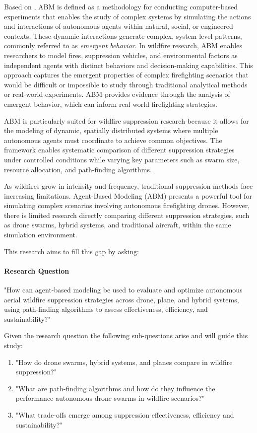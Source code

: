 \documentclass[twoside]{article}
\begin{document}
Based on \citet{wilensky2015introduction}, ABM is defined as a methodology for conducting computer-based experiments that enables the study of complex systems by simulating the actions and interactions of autonomous agents within natural, social, or engineered contexts. These dynamic interactions generate complex, system-level patterns, commonly referred to as \textit{emergent behavior}. In wildfire research, ABM enables researchers to model fires, suppression vehicles, and environmental factors as independent agents with distinct behaviors and decision-making capabilities. This approach captures the emergent properties of complex firefighting scenarios that would be difficult or impossible to study through traditional analytical methods or real-world experiments. ABM provides evidence through the analysis of emergent behavior, which can inform real-world firefighting strategies.

ABM is particularly suited for wildfire suppression research because it allows for the modeling of dynamic, spatially distributed systems where multiple autonomous agents must coordinate to achieve common objectives. The framework enables systematic comparison of different suppression strategies under controlled conditions while varying key parameters such as swarm size, resource allocation, and path-finding algorithms.

As wildfires grow in intensity and frequency, traditional suppression methods face increasing limitations. Agent-Based Modeling (ABM) presents a powerful tool for simulating complex scenarios involving autonomous firefighting drones. However, there is limited research directly comparing different suppression strategies, such as drone swarms, hybrid systems, and traditional aircraft, within the same simulation environment.

This research aims to fill this gap by asking:

\paragraph{Research Question}

"How can agent-based modeling be used to evaluate and optimize autonomous aerial wildfire suppression strategies across drone, plane, and hybrid systems, using path-finding algorithms to assess effectiveness, efficiency, and sustainability?"

Given the research question the following sub-questions arise and will guide this study:
\begin{enumerate}
    \item "How do drone swarms, hybrid systems, and planes compare in wildfire suppression?"
    \item "What are path-finding algorithms and how do they influence the performance autonomous drone swarms in wildfire scenarios?"
    \item "What trade-offs emerge among suppression effectiveness, efficiency and sustainability?"
\end{enumerate}
\end{document}
